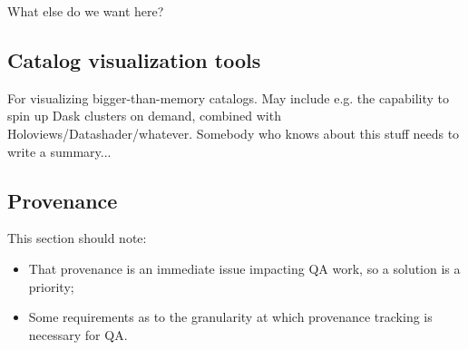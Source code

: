 \documentclass[DM,authoryear,toc,lsstdraft]{lsstdoc}
\begin{document}
What else do we want here?


\subsection{Catalog visualization tools}


For visualizing bigger-than-memory catalogs. May include e.g. the capability
to spin up Dask clusters on demand, combined with
Holoviews/Datashader/whatever. Somebody who knows about this stuff needs to
write a summary...

\subsection{Provenance}


This section should note:

\begin{itemize}

  \item{That provenance is an immediate issue impacting QA work, so a solution
  is a priority;}

  \item{Some requirements as to the granularity at which provenance tracking
  is necessary for QA.}

\end{itemize}

\appendix
\glsaddall
\printglossary[style=index]


\end{document}
